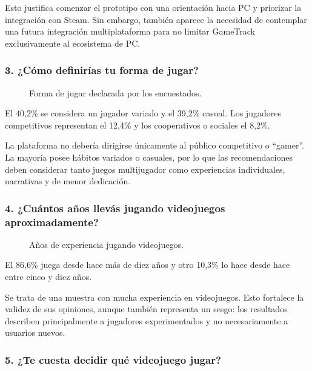 Esto justifica comenzar el prototipo con una orientación hacia PC y priorizar la integración con Steam. Sin embargo, también aparece la necesidad de contemplar una futura integración multiplataforma para no limitar GameTrack exclusivamente al ecosistema de PC.

\subsubsection*{3. ¿Cómo definirías tu forma de jugar?}

\begin{figure}[H]
	\centering
	\caption{Forma de jugar declarada por los encuestados.}
	\label{fig:enc-p03}
\end{figure}

El 40,2\% se considera un jugador variado y el 39,2\% casual. Los jugadores competitivos representan el 12,4\% y los cooperativos o sociales el 8,2\%.

La plataforma no debería dirigirse únicamente al público competitivo o \enquote{gamer}. La mayoría posee hábitos variados o casuales, por lo que las recomendaciones deben considerar tanto juegos multijugador como experiencias individuales, narrativas y de menor dedicación.

\subsubsection*{4. ¿Cuántos años llevás jugando videojuegos aproximadamente?}

\begin{figure}[H]
	\centering
	\caption{Años de experiencia jugando videojuegos.}
	\label{fig:enc-p04}
\end{figure}

El 86,6\% juega desde hace más de diez años y otro 10,3\% lo hace desde hace entre cinco y diez años.

Se trata de una muestra con mucha experiencia en videojuegos. Esto fortalece la validez de sus opiniones, aunque también representa un sesgo: los resultados describen principalmente a jugadores experimentados y no necesariamente a usuarios nuevos.

\subsubsection*{5. ¿Te cuesta decidir qué videojuego jugar?}

